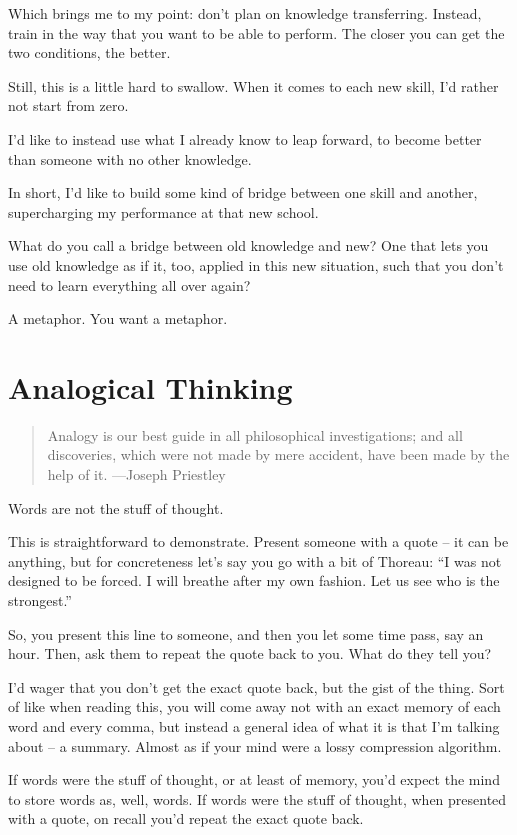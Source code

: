 Which brings me to my point: don't plan on knowledge transferring. Instead,
train in the way that you want to be able to perform. The closer you can get the
two conditions, the better.

Still, this is a little hard to swallow.  When it comes to each new skill, I'd
rather not start from zero.

I'd like to instead use what I already know to leap forward, to become better
than someone with no other knowledge.

In short, I'd like to build some kind of bridge between one skill and another,
supercharging my performance at that new school.

What do you call a bridge between old knowledge and new? One that lets you use
old knowledge as if it, too, applied in this new situation, such that you don't
need to learn everything all over again?

A metaphor. You want a metaphor.

\section{Analogical Thinking}

\begin{quote}
Analogy is our best guide in all philosophical investigations; and all
discoveries, which were not made by mere accident, have been made by the
help of it. \label{quote-attribute}{---Joseph Priestley}
\end{quote}

Words are not the stuff of thought.

This is straightforward to demonstrate. Present someone with a quote --
it can be anything, but for concreteness let's say you go with a bit of
Thoreau: ``I was not designed to be forced. I will breathe after my own
fashion. Let us see who is the strongest.''

So, you present this line to someone, and then you let some time pass,
say an hour. Then, ask them to repeat the quote back to you. What do
they tell you?

I'd wager that you don't get the exact quote back, but the gist of the
thing. Sort of like when reading this, you will come away not with an
exact memory of each word and every comma, but instead a general idea of
what it is that I'm talking about -- a summary. Almost as if your mind
were a lossy compression algorithm.

If words were the stuff of thought, or at least of memory, you'd expect
the mind to store words as, well, words. If words were the stuff of
thought, when presented with a quote, on recall you'd repeat the exact
quote back.

